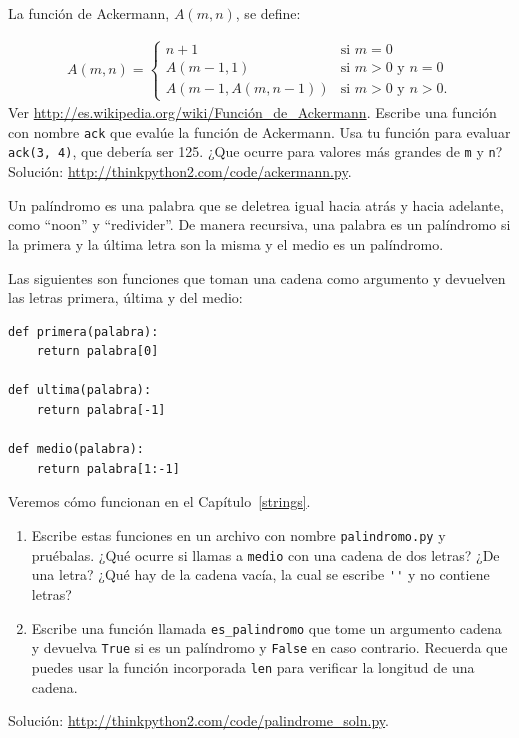 \documentclass[10pt]{book}
\begin{document}
\begin{exercise}
\label{ackermann}

La función de Ackermann, $A(m, n)$, se define:

\begin{eqnarray*}
A(m, n) = \begin{cases}
              n+1 & \mbox{si } m = 0 \\
        A(m-1, 1) & \mbox{si } m > 0 \mbox{ y } n = 0 \\
A(m-1, A(m, n-1)) & \mbox{si } m > 0 \mbox{ y } n > 0.
\end{cases}
\end{eqnarray*}
%
Ver \url{http://es.wikipedia.org/wiki/Función_de_Ackermann}.
Escribe una función con nombre {\tt ack} que evalúe la función de Ackermann.
Usa tu función para evaluar {\tt ack(3, 4)}, que debería ser 125.
¿Que ocurre para valores más grandes de {\tt m} y {\tt n}?
Solución: \url{http://thinkpython2.com/code/ackermann.py}.

\end{exercise}


\begin{exercise}
\label{palindrome}

Un palíndromo es una palabra que se deletrea igual hacia atrás y
hacia adelante, como ``noon'' y ``redivider''.  De manera recursiva, una palabra
es un palíndromo si la primera y la última letra son la misma
y el medio es un palíndromo.

Las siguientes son funciones que toman una cadena como argumento y
devuelven las letras primera, última y del medio:

\begin{verbatim}
def primera(palabra):
    return palabra[0]

def ultima(palabra):
    return palabra[-1]

def medio(palabra):
    return palabra[1:-1]
\end{verbatim}
%
Veremos cómo funcionan en el Capítulo~\ref{strings}.

\begin{enumerate}

\item Escribe estas funciones en un archivo con nombre {\tt palindromo.py}
y pruébalas.  ¿Qué ocurre si llamas a {\tt medio} con
una cadena de dos letras?  ¿De una letra?  ¿Qué hay de la cadena
vacía, la cual se escribe \verb"''" y no contiene letras?

\item Escribe una función llamada \verb"es_palindromo" que tome
un argumento cadena y devuelva {\tt True} si es un palíndromo
y {\tt False} en caso contrario.  Recuerda que puedes usar la
función incorporada {\tt len} para verificar la longitud de una cadena.

\end{enumerate}

Solución: \url{http://thinkpython2.com/code/palindrome_soln.py}.

\end{exercise}
\end{document}
